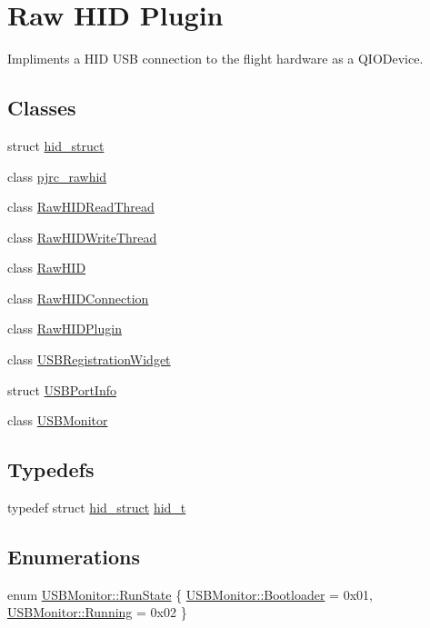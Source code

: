 \hypertarget{group___raw_h_i_d_plugin}{\section{\-Raw \-H\-I\-D \-Plugin}
\label{group___raw_h_i_d_plugin}
}


\-Impliments a \-H\-I\-D \-U\-S\-B connection to the flight hardware as a \-Q\-I\-O\-Device.  


\subsection*{\-Classes}
\begin{DoxyCompactItemize}
\item 
struct \hyperlink{structhid__struct}{hid\-\_\-struct}
\item 
class \hyperlink{classpjrc__rawhid}{pjrc\-\_\-rawhid}
\item 
class \hyperlink{class_raw_h_i_d_read_thread}{\-Raw\-H\-I\-D\-Read\-Thread}
\item 
class \hyperlink{class_raw_h_i_d_write_thread}{\-Raw\-H\-I\-D\-Write\-Thread}
\item 
class \hyperlink{class_raw_h_i_d}{\-Raw\-H\-I\-D}
\item 
class \hyperlink{class_raw_h_i_d_connection}{\-Raw\-H\-I\-D\-Connection}
\item 
class \hyperlink{class_raw_h_i_d_plugin}{\-Raw\-H\-I\-D\-Plugin}
\item 
class \hyperlink{class_u_s_b_registration_widget}{\-U\-S\-B\-Registration\-Widget}
\item 
struct \hyperlink{struct_u_s_b_port_info}{\-U\-S\-B\-Port\-Info}
\item 
class \hyperlink{class_u_s_b_monitor}{\-U\-S\-B\-Monitor}
\end{DoxyCompactItemize}
\subsection*{\-Typedefs}
\begin{DoxyCompactItemize}
\item 
typedef struct \hyperlink{structhid__struct}{hid\-\_\-struct} \hyperlink{group___raw_h_i_d_plugin_gace038be945e544c81ea45cabfb08655b}{hid\-\_\-t}
\end{DoxyCompactItemize}
\subsection*{\-Enumerations}
\begin{DoxyCompactItemize}
\item 
enum \hyperlink{group___raw_h_i_d_plugin_gaff6bf8945a7cdab907cf5adc29bec064}{\-U\-S\-B\-Monitor\-::\-Run\-State} \{ \hyperlink{group___raw_h_i_d_plugin_ggaff6bf8945a7cdab907cf5adc29bec064ac18f9b621b18e8d33c36467a92dd0dc9}{\-U\-S\-B\-Monitor\-::\-Bootloader} =  0x01, 
\hyperlink{group___raw_h_i_d_plugin_ggaff6bf8945a7cdab907cf5adc29bec064a1a9efe940184d4bec69cb5d343eaaf81}{\-U\-S\-B\-Monitor\-::\-Running} =  0x02
 \}
\end{DoxyCompactItemize}
